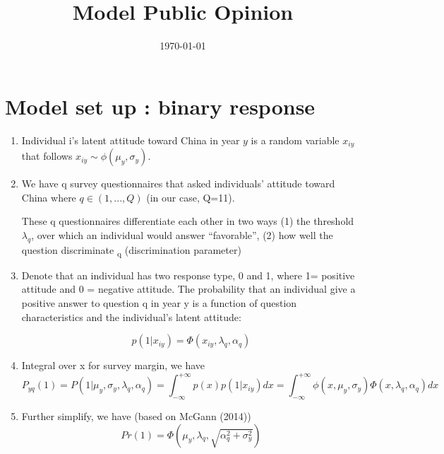 \documentclass{article}
\title{Model Public Opinion}
\date{\today}
\begin{document}
\maketitle

\section{Model set up : binary response}
\begin{enumerate}
    \item Individual i's latent attitude toward China in  year $y$ is a random variable  $x_{iy}$ that follows $x_{iy} \sim \phi(\mu_y ,\sigma_y )$. 
    
    \item We have q survey questionnaires that asked individuals’ attitude toward China where  $q \in (1,..., Q)$ (in our case, Q=11).
    
    These q questionnaires differentiate each other in two ways 
    \subitem (1) the threshold $\lambda_q$, over which an individual would answer ``favorable'',   
    \subitem (2) how well the question discriminate  \textalpha\textsubscript{q} (discrimination parameter)
    
    \item Denote that an individual has two response type, 0 and 1, where 1= positive attitude and 0 = negative attitude.  The probability that an individual give a positive answer to question q in year y is a function of question characteristics and the individual's latent attitude:
    
    \begin{equation}
        p(1| x_{iy}) = \Phi(x_{iy}, \lambda_q, \alpha_q)
    \end{equation}
    
    \item Integral over x for survey margin, we have    
    \begin{equation}
        P_{yq}(1) = P(1|\mu_y, \sigma_y, \lambda_q, \alpha_q) =\int_{-\infty}^{+\infty} p(x)p(1|x_{iy}) dx
              =  \int_{-\infty}^{+\infty}
        \phi(x,\mu_y, \sigma_y)\Phi(x,\lambda_q,\alpha_q)dx
    \end{equation}
    
    \item Further simplify, we have (based on McGann (2014))
        \begin{equation}
             Pr(1) = \Phi(\mu_y,\lambda_q, \sqrt{\alpha _q^2 + \sigma_y^2})
    \end{equation}
    


\end{enumerate}
\end{document}
